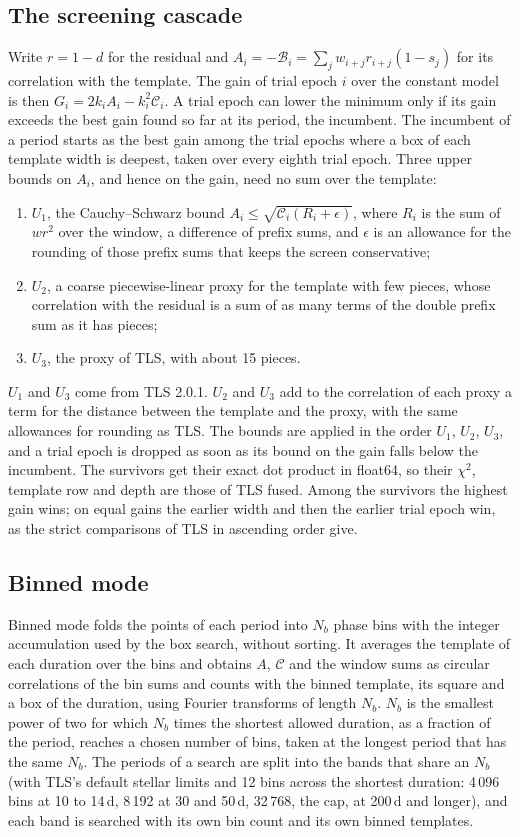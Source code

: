 \documentclass{aastex631}
\begin{document}
\subsection{The screening cascade}\label{sec:screen}
Write $r=1-d$ for the residual and $A_i=-\mathcal{B}_i=\sum_j w_{i+j}r_{i+j}(1-s_j)$ for its correlation with the template. The gain of trial epoch $i$ over the constant model is then $G_i=2k_iA_i-k_i^2\mathcal{C}_i$. A trial epoch can lower the minimum only if its gain exceeds the best gain found so far at its period, the incumbent. The incumbent of a period starts as the best gain among the trial epochs where a box of each template width is deepest, taken over every eighth trial epoch. Three upper bounds on $A_i$, and hence on the gain, need no sum over the template:
\begin{enumerate}
\item $U_1$, the Cauchy--Schwarz bound $A_i\le\sqrt{\mathcal{C}_i(R_i+\epsilon)}$, where $R_i$ is the sum of $wr^2$ over the window, a difference of prefix sums, and $\epsilon$ is an allowance for the rounding of those prefix sums that keeps the screen conservative;
\item $U_2$, a coarse piecewise-linear proxy for the template with few pieces, whose correlation with the residual is a sum of as many terms of the double prefix sum as it has pieces;
\item $U_3$, the proxy of TLS, with about 15 pieces.
\end{enumerate}
$U_1$ and $U_3$ come from TLS 2.0.1. $U_2$ and $U_3$ add to the correlation of each proxy a term for the distance between the template and the proxy, with the same allowances for rounding as TLS. The bounds are applied in the order $U_1$, $U_2$, $U_3$, and a trial epoch is dropped as soon as its bound on the gain falls below the incumbent. The survivors get their exact dot product in float64, so their $\chi^2$, template row and depth are those of TLS fused. Among the survivors the highest gain wins; on equal gains the earlier width and then the earlier trial epoch win, as the strict comparisons of TLS in ascending order give.

\subsection{Binned mode}\label{sec:binned}
Binned mode folds the points of each period into $N_b$ phase bins with the integer accumulation used by the box search, without sorting. It averages the template of each duration over the bins and obtains $A$, $\mathcal{C}$ and the window sums as circular correlations of the bin sums and counts with the binned template, its square and a box of the duration, using Fourier transforms of length $N_b$. $N_b$ is the smallest power of two for which $N_b$ times the shortest allowed duration, as a fraction of the period, reaches a chosen number of bins, taken at the longest period that has the same $N_b$. The periods of a search are split into the bands that share an $N_b$ (with TLS's default stellar limits and 12 bins across the shortest duration: 4\,096 bins at 10 to 14\,d, 8\,192 at 30 and 50\,d, 32\,768, the cap, at 200\,d and longer), and each band is searched with its own bin count and its own binned templates.
\end{document}
